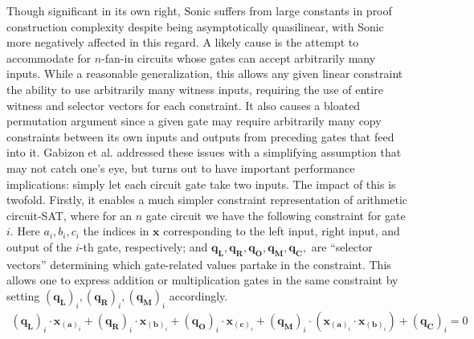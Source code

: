 \noindent Though significant in its own right, Sonic suffers from large constants in proof construction complexity despite being asymptotically quasilinear, with Sonic more negatively affected in this regard. A likely cause is the attempt to accommodate for $n$-fan-in circuits whose gates can accept arbitrarily many inputs. While a reasonable generalization, this allows any given linear constraint the ability to use arbitrarily many witness inputs, requiring the use of entire witness and selector vectors for each constraint. It also causes a bloated permutation argument since a given gate may require arbitrarily many copy constraints between its own inputs and outputs from preceding gates that feed into it. Gabizon et al. \cite{plonk} addressed these issues with a simplifying assumption that may not catch one's eye, but turns out to have important performance implications: simply let each circuit gate take two inputs. The impact of this is twofold. Firstly, it enables a much simpler constraint representation of arithmetic circuit-SAT, where for an $n$ gate circuit we have the following constraint for gate $i$. Here $a_i, b_i, c_i$ the indices in $\mathbf{x}$ corresponding to the left input, right input, and output of the $i$-th gate, respectively; and $\mathbf{q_L}, \mathbf{q_R},\mathbf{q_O},\mathbf{q_M},\mathbf{q_C},$ are ``selector vectors'' determining which gate-related values partake in the constraint. This allows one to express addition or multiplication gates in the same constraint by setting $(\mathbf{q_L})_i, (\mathbf{q_R})_i, (\mathbf{q_M})_i$ accordingly. 
\begin{align}
(\mathbf{q_L})_i \cdot \mathbf{x}_{(\mathbf{a})_i} + (\mathbf{q_R})_i \cdot \mathbf{x}_{(\mathbf{b})_i} + (\mathbf{q_O})_i \cdot \mathbf{x}_{(\mathbf{c})_i} + (\mathbf{q_M})_i \cdot (\mathbf{x}_{(\mathbf{a})_i} \cdot \mathbf{x}_{(\mathbf{b})_i}) + (\mathbf{q_C})_i = 0
\end{align}


